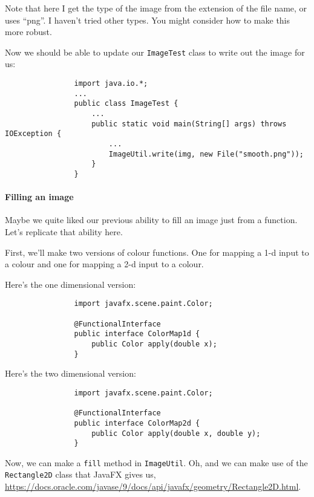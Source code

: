 \documentclass{article}
\begin{document}
            Note that here I get the type of the image from the extension of the file name, or uses ``png''. I haven't tried other types.
            You might consider how to make this more robust.
        
            Now we should be able to update our \texttt{ImageTest} class to write out the image for us:
            
            \begin{verbatim}
                import java.io.*;
                ...
                public class ImageTest {
                    ...
                    public static void main(String[] args) throws IOException {
                        ...
                        ImageUtil.write(img, new File("smooth.png"));
                    }
                }
            \end{verbatim}
        
        \paragraph{Filling an image}
            Maybe we quite liked our previous ability to fill an image just from a function. Let's replicate that ability here.
            
            First, we'll make two versions of colour functions. One for mapping a 1-d input to a colour and one for mapping a 2-d input to
            a colour.

            Here's the one dimensional version:
            \begin{verbatim}
                import javafx.scene.paint.Color;
                
                @FunctionalInterface
                public interface ColorMap1d {
                    public Color apply(double x);
                }
            \end{verbatim}

            Here's the two dimensional version:
            \begin{verbatim}
                import javafx.scene.paint.Color;
                
                @FunctionalInterface
                public interface ColorMap2d {
                    public Color apply(double x, double y);
                }
            \end{verbatim}
            
            Now, we can make a \texttt{fill} method in \texttt{ImageUtil}. Oh, and we can make use of the \texttt{Rectangle2D} class that
            JavaFX gives us, \url{https://docs.oracle.com/javase/9/docs/api/javafx/geometry/Rectangle2D.html}.
            
\end{document}
